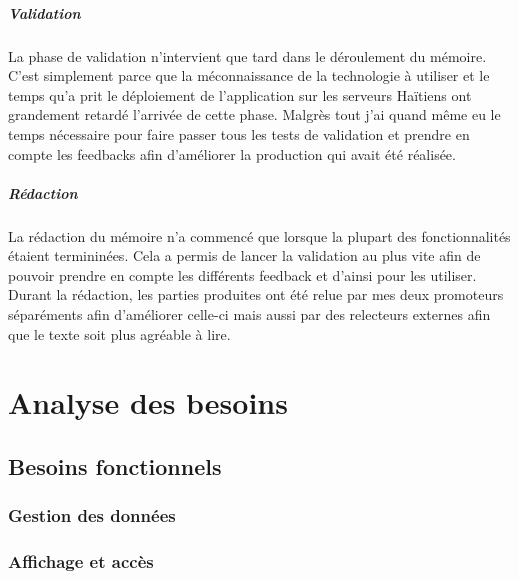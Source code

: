 \documentclass{EPL-master-thesis-covers-FR}
\begin{document}
			\paragraph*{Validation}
			La phase de validation n'intervient que tard dans le déroulement du mémoire. C'est simplement parce que la méconnaissance de la technologie à utiliser et le temps qu'a prit le déploiement de l'application sur les serveurs Haïtiens ont grandement retardé l'arrivée de cette phase. Malgrès tout j'ai quand même eu le temps nécessaire pour faire passer tous les tests de validation et prendre en compte les feedbacks afin d'améliorer la production qui avait été réalisée.			
			
			
			\paragraph*{Rédaction}
			La rédaction du mémoire n'a commencé que lorsque la plupart des fonctionnalités étaient termininées. Cela a permis de lancer la validation au plus vite afin de pouvoir prendre en compte les différents feedback et d'ainsi pour les utiliser.
			Durant la rédaction, les parties produites ont été relue par mes deux promoteurs séparéments afin d'améliorer celle-ci mais aussi par des relecteurs externes afin que le texte soit plus agréable à lire. 
			
			

	\chapter{Analyse des besoins}
		\label{sec:analyse_besoins}


		\section{Besoins fonctionnels}

			

			\subsection*{Gestion des données}
				\label{sec:gest_donnee}



			\subsection*{Affichage et accès}
\end{document}
